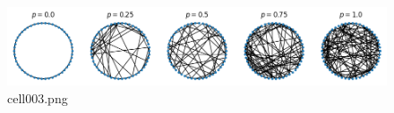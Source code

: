 \begin{figure}[ht]
	\centering
	\includegraphics[scale=0.8, max width=\linewidth]{./fig/appendix/graph-theory-network-model/cell003.png}
	\caption{cell003.png}
	\label{cell003.png}
\end{figure}